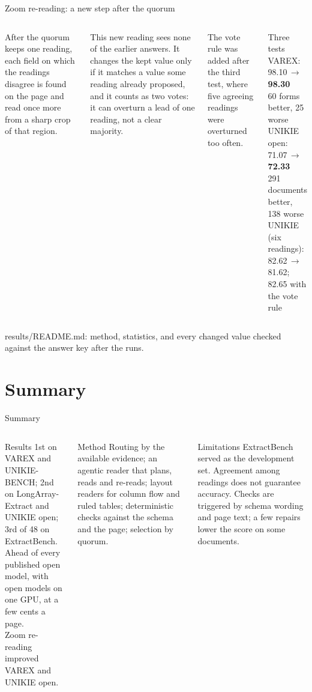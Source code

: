 \documentclass[aspectratio=169,10pt]{beamer}
\newcommand{\src}[1]{\par\vfill{\tiny\color{muted}#1\par}}
\begin{document}
\begin{frame}{Zoom re-reading: a new step after the quorum}
\begin{columns}[T]
\small
After the quorum keeps one reading, each field on which the readings disagree is found on the page and read once more from a sharp crop of that region.\par\vspace{0.5em}
This new reading sees none of the earlier answers. It changes the kept value only if it matches a value some reading already proposed, and it counts as two votes: it can overturn a lead of one reading, not a clear majority.\par\vspace{0.5em}
The vote rule was added after the third test, where five agreeing readings were overturned too often.
\begin{block}{Three tests}
\small
VAREX: 98.10\,$\rightarrow$\,\textbf{98.30}\\
60 forms better, 25 worse\\[0.5em]
UNIKIE open: 71.07\,$\rightarrow$\,\textbf{72.33}\\
291 documents better, 138 worse\\[0.5em]
UNIKIE (six readings): 82.62\,$\rightarrow$\,81.62; 82.65 with the vote rule
\end{block}
\end{columns}
\src{results/README.md: method, statistics, and every changed value checked against the answer key after the runs.}
\end{frame}
\section{Summary}
\begin{frame}{Summary}
\begin{columns}[T]
\begin{block}{Results}
\small
1st on VAREX and UNIKIE-BENCH; 2nd on LongArray-Extract and UNIKIE open; 3rd of 48 on ExtractBench.\\[0.3em]
Ahead of every published open model, with open models on one GPU, at a few cents a page.\\[0.3em]
Zoom re-reading improved VAREX and UNIKIE open.
\end{block}
\begin{block}{Method}
\small
Routing by the available evidence; an agentic reader that plans, reads and re-reads; layout readers for column flow and ruled tables; deterministic checks against the schema and the page; selection by quorum.
\end{block}
\begin{block}{Limitations}
\small
ExtractBench served as the development set. Agreement among readings does not guarantee accuracy. Checks are triggered by schema wording and page text; a few repairs lower the score on some documents.
\end{block}
\end{columns}
\end{frame}
\end{document}
